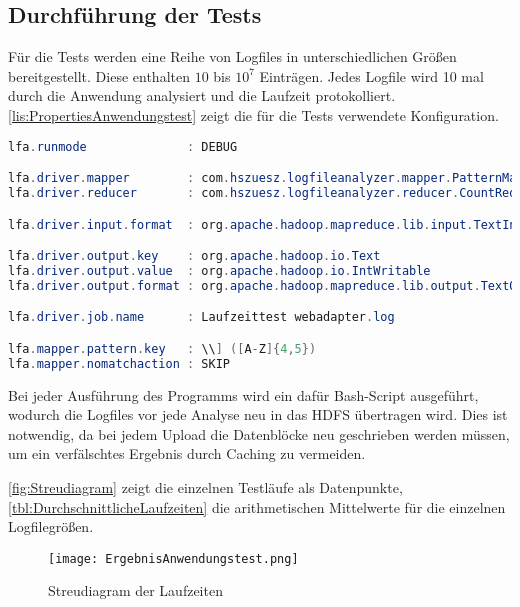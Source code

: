 \subsection{Durchführung der Tests}
Für die Tests werden eine Reihe von Logfiles in unterschiedlichen Größen bereitgestellt. Diese enthalten $10$ bis $10^7$ Einträgen. Jedes Logfile wird 10 mal durch die Anwendung analysiert und die Laufzeit protokolliert. \autoref{lis:PropertiesAnwendungstest} zeigt die für die Tests verwendete Konfiguration. \\

\begin{lstlisting}[language=Java,caption=Properties für Anwendungstest,label=lis:PropertiesAnwendungstest]
lfa.runmode              : DEBUG

lfa.driver.mapper        : com.hszuesz.logfileanalyzer.mapper.PatternMapper
lfa.driver.reducer       : com.hszuesz.logfileanalyzer.reducer.CountReducer

lfa.driver.input.format  : org.apache.hadoop.mapreduce.lib.input.TextInputFormat

lfa.driver.output.key    : org.apache.hadoop.io.Text
lfa.driver.output.value  : org.apache.hadoop.io.IntWritable
lfa.driver.output.format : org.apache.hadoop.mapreduce.lib.output.TextOutputFormat

lfa.driver.job.name      : Laufzeittest webadapter.log

lfa.mapper.pattern.key   : \\] ([A-Z]{4,5})
lfa.mapper.nomatchaction : SKIP
\end{lstlisting}

Bei jeder Ausführung des Programms wird ein dafür Bash-Script ausgeführt, wodurch die Logfiles vor jede Analyse neu in das \ac{HDFS} übertragen wird. Dies ist notwendig, da bei jedem Upload die Datenblöcke neu geschrieben werden müssen, um ein verfälschtes Ergebnis durch Caching zu vermeiden.

\autoref{fig:Streudiagram} zeigt die einzelnen Testläufe als Datenpunkte, \autoref{tbl:DurchschnittlicheLaufzeiten} die arithmetischen Mittelwerte für die einzelnen Logfilegrößen.

\begin{figure}
	\centering
	\texttt{[image: ErgebnisAnwendungstest.png]}
	\caption{Streudiagram der Laufzeiten}
	\label{fig:Streudiagram}
\end{figure}

